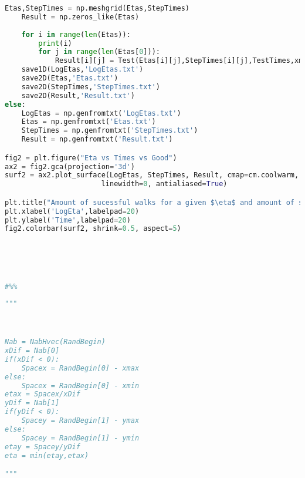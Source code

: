 \documentclass[a4paper]{article}
\begin{document}
\begin{lstlisting}[language=Python]
    Etas,StepTimes = np.meshgrid(Etas,StepTimes)
    Result = np.zeros_like(Etas)
    
    for i in range(len(Etas)):
        print(i)
        for j in range(len(Etas[0])):
            Result[i][j] = Test(Etas[i][j],StepTimes[i][j],TestTimes,xmin,xmax,ymin,ymax,MinDistance)
    save1D(LogEtas,'LogEtas.txt')
    save2D(Etas,'Etas.txt')
    save2D(StepTimes,'StepTimes.txt')
    save2D(Result,'Result.txt')
else:
    LogEtas = np.genfromtxt('LogEtas.txt')
    Etas = np.genfromtxt('Etas.txt')
    StepTimes = np.genfromtxt('StepTimes.txt')
    Result = np.genfromtxt('Result.txt')

fig2 = plt.figure("Eta vs Times vs Good")
ax2 = fig2.gca(projection='3d')
surf2 = ax2.plot_surface(LogEtas, StepTimes, Result, cmap=cm.coolwarm,
                       linewidth=0, antialiased=True)

plt.title("Amount of sucessful walks for a given $\eta$ and amount of steps.")
plt.xlabel('LogEta',labelpad=20)
plt.ylabel('Time',labelpad=20)
fig2.colorbar(surf2, shrink=0.5, aspect=5)





#%%
    
"""



Nab = NabHvec(RandBegin)
xDif = Nab[0]
if(xDif < 0):
    Spacex = RandBegin[0] - xmax
else:
    Spacex = RandBegin[0] - xmin
etax = Spacex/xDif
yDif = Nab[1]
if(yDif < 0):
    Spacey = RandBegin[1] - ymax
else:
    Spacey = RandBegin[1] - ymin
etay = Spacey/yDif
eta = min(etay,etax)

"""
\end{lstlisting}
\end{document}
